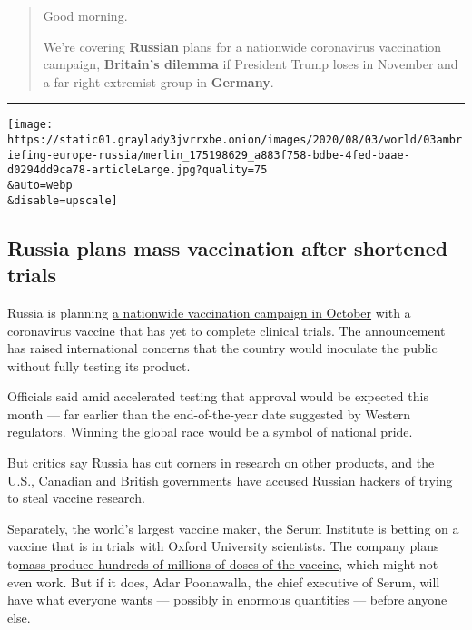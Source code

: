 \begin{quote}
Good morning.

We're covering \textbf{Russian} plans for a nationwide coronavirus
vaccination campaign, \textbf{Britain's dilemma} if President Trump
loses in November and a far-right extremist group in \textbf{Germany}.
\end{quote}

\begin{center}\rule{0.5\linewidth}{\linethickness}\end{center}

\texttt{[image: https://static01.graylady3jvrrxbe.onion/images/2020/08/03/world/03ambriefing-europe-russia/merlin\_175198629\_a883f758-bdbe-4fed-baae-d0294dd9ca78-articleLarge.jpg?quality=75\\\&auto=webp\\\&disable=upscale]}

\hypertarget{russia-plans-mass-vaccination-after-shortened-trials}{%
\subsection{Russia plans mass vaccination after shortened
trials}\label{russia-plans-mass-vaccination-after-shortened-trials}}

Russia is planning
\href{https://www.nytimes3xbfgragh.onion/2020/08/02/world/europe/russia-trials-vaccine-October.html}{a
nationwide vaccination campaign in October} with a coronavirus vaccine
that has yet to complete clinical trials. The announcement has raised
international concerns that the country would inoculate the public
without fully testing its product.

Officials said amid accelerated testing that approval would be expected
this month --- far earlier than the end-of-the-year date suggested by
Western regulators. Winning the global race would be a symbol of
national pride.

But critics say Russia has cut corners in research on other products,
and the U.S., Canadian and British governments have accused Russian
hackers of trying to steal vaccine research.

Separately, the world's largest vaccine maker, the Serum Institute is
betting on a vaccine that is in trials with Oxford University
scientists. The company plans
to\href{https://www.nytimes3xbfgragh.onion/2020/08/01/world/asia/coronavirus-vaccine-india.html}{mass
produce hundreds of millions of doses of the vaccine,} which might not
even work. But if it does, Adar Poonawalla, the chief executive of
Serum, will have what everyone wants --- possibly in enormous quantities
--- before anyone else.

